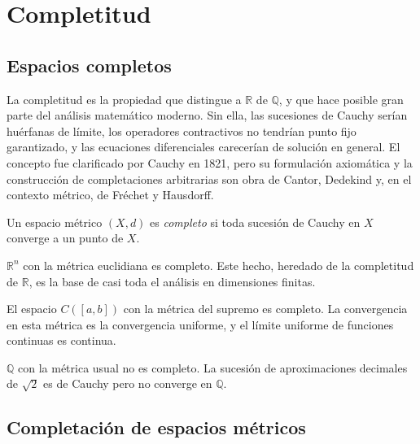 \chapter{Completitud}
\label{ch:completitud}

\section{Espacios completos}

La completitud es la propiedad que distingue a $\mathbb{R}$ de $\mathbb{Q}$, y que hace posible gran parte del análisis matemático moderno. Sin ella, las sucesiones de Cauchy serían huérfanas de límite, los operadores contractivos no tendrían punto fijo garantizado, y las ecuaciones diferenciales carecerían de solución en general. El concepto fue clarificado por Cauchy en 1821, pero su formulación axiomática y la construcción de completaciones arbitrarias son obra de Cantor, Dedekind y, en el contexto métrico, de Fréchet y Hausdorff.

\begin{definition}
\label{def:espacio-completo}
Un espacio métrico $(X,d)$ es \emph{completo} si toda sucesión de Cauchy en $X$ converge a un punto de $X$.
\end{definition}

\begin{example}
\label{ej:rn-completo}
$\mathbb{R}^n$ con la métrica euclidiana es completo. Este hecho, heredado de la completitud de $\mathbb{R}$, es la base de casi toda el análisis en dimensiones finitas.
\end{example}

\begin{example}
\label{ej:cb-completo}
El espacio $C([a,b])$ con la métrica del supremo es completo. La convergencia en esta métrica es la convergencia uniforme, y el límite uniforme de funciones continuas es continua.
\end{example}

\begin{example}
\label{ej:q-incompleto}
$\mathbb{Q}$ con la métrica usual no es completo. La sucesión de aproximaciones decimales de $\sqrt{2}$ es de Cauchy pero no converge en $\mathbb{Q}$.
\end{example}

\section{Completación de espacios métricos}

